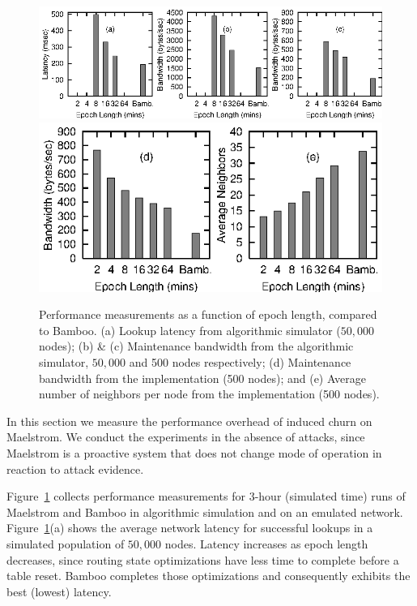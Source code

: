 \documentclass[10pt,twocolumn]{article}
\begin{document}
\begin{figure}
\centerline{\includegraphics{graphs/simPerformance}\includegraphics{bw_results/bwneighbors}}
\caption{Performance measurements as a function of epoch length,
  compared to Bamboo. (a) Lookup latency from algorithmic simulator
  ($50,000$ nodes); (b) \& (c) Maintenance bandwidth from the algorithmic
  simulator, $50,000$ and 500 nodes respectively; (d) Maintenance
  bandwidth from the implementation (500 nodes); and (e) Average number of neighbors
  per node from the implementation (500 nodes).}
\label{fig:performance}
\end{figure}



In this section we measure the performance overhead of induced churn on
Maelstrom. We conduct the experiments in the absence of attacks, since
Maelstrom is a proactive system that does not change mode of operation
in reaction to attack evidence.

Figure~\ref{fig:performance} collects performance measurements for
3-hour (simulated time) runs of Maelstrom and Bamboo in algorithmic simulation and on an
emulated network.  Figure~\ref{fig:performance}(a) shows the average network 
latency for successful lookups in a simulated population of $50,000$
nodes.  Latency increases as epoch length decreases, since routing state
optimizations have less time to complete before a table reset.  Bamboo
completes those optimizations and consequently exhibits the best (lowest) latency. 
\end{document}
